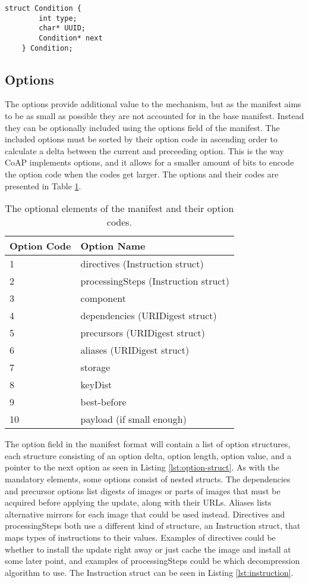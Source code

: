\documentclass[0-thesis.tex]{subfiles}
\begin{document}
\begin{lstlisting}[caption={The format of vendor, class, and device ID conditions.}, 
                    label={lst:condition-struct}]
    struct Condition {
        int type;
        char* UUID;
        Condition* next
    } Condition;
\end{lstlisting}

\subsection{Options}
\label{ssec:options}
The options provide additional value to the mechanism, but as the manifest aims to be as
small as possible they are not accounted for in the base manifest. Instead they can be
optionally included using the options field of the manifest. The included options must be
sorted by their option code in ascending order to calculate a delta between the current
and preceeding option. This is the way CoAP implements options, and it allows for a
smaller amount of bits to encode the option code when the codes get larger. The options
and their codes are presented in Table \ref{tab:option-codes}.

\begin{longtable}[]{@{}ll@{}}
    \caption{The optional elements of the manifest and their option codes.}
    \label{tab:option-codes}\\
    \toprule
    Option Code & Option Name\tabularnewline
    \midrule
    \endhead
    1 & directives (Instruction struct)\tabularnewline
    2 & processingSteps (Instruction struct)\tabularnewline
    3 & component\tabularnewline
    4 & dependencies (URIDigest struct)\tabularnewline
    5 & precursors (URIDigest struct)\tabularnewline
    6 & aliases (URIDigest struct)\tabularnewline
    7 & storage\tabularnewline
    8 & keyDist\tabularnewline
    9 & best-before\tabularnewline
    10 & payload (if small enough)\tabularnewline
    \bottomrule
\end{longtable}

The option field in the manifest format will contain a list of option structures, each
structure consisting of an option delta, option length, option value, and a pointer to the
next option as seen in Listing \ref{lst:option-struct}. As with the mandatory elements,
some options consist of nested structs. The dependencies and precursor options list
digests of images or parts of images that must be acquired before applying the update,
along with their URLs. Aliases lists alternative mirrors for each image that could be used
instead. Directives and processingSteps both use a different kind of structure, an
Instruction struct, that maps types of instructions to their values. Examples of
directives could be whether to install the update right away or just cache the image and
install at some later point, and examples of processingSteps could be which decompression
algorithm to use. The Instruction struct can be seen in Listing \ref{lst:instruction}.
\end{document}
